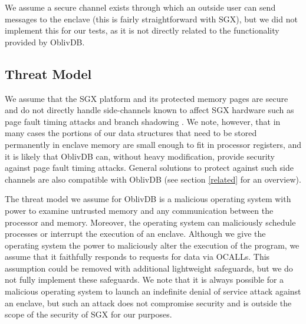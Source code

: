 \documentclass[USenglish,oneside,twocolumn]{article}
\def\name/{OblivDB}
\begin{document}
We assume a secure channel exists through which an outside user can send messages to the enclave (this is fairly straightforward with SGX), but we did not implement this for our tests, as it is not directly related to the functionality provided by \name/.

\subsection{Threat Model}
We assume that the SGX platform and its protected memory pages are secure and do not directly handle side-channels known to affect SGX hardware such as page fault timing attacks \cite{XCP15} and branch shadowing \cite{LSG+16}. We note, however, that in many cases the portions of our data structures that need to be stored permanently in enclave memory are small enough to fit in processor registers, and it is likely that \name/ can, without heavy modification, provide security against page fault timing attacks. General solutions to protect against such side channels are also compatible with \name/ (see section \ref{related} for an overview). 

The threat model we assume for \name/ is a malicious operating system with power to examine untrusted memory and any communication between the processor and memory. Moreover, the operating system can maliciously schedule processes or interrupt the execution of an enclave. Although we give the operating system the power to maliciously alter the execution of the program, we assume that it faithfully responds to requests for data via OCALLs. This assumption could be removed with additional lightweight safeguards, but we do not fully implement these safeguards. We note that it is always possible for a malicious operating system to launch an indefinite denial of service attack against an enclave, but such an attack does not compromise security and is outside the scope of the security of SGX for our purposes. 
 
\end{document}
